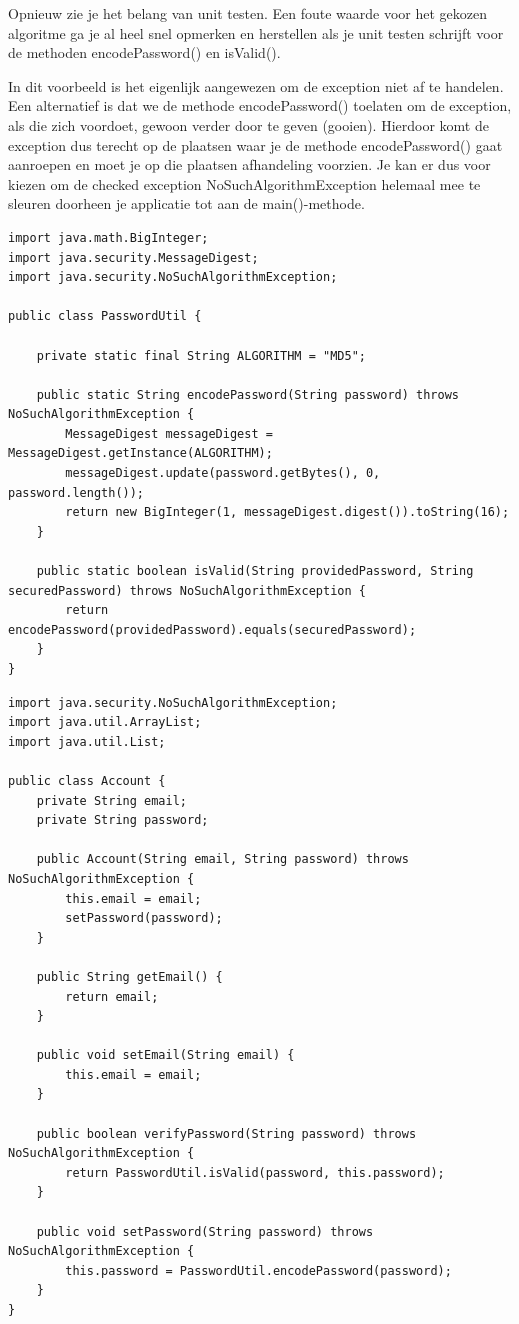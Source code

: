 \documentclass{tstextbook}
\begin{document}
Opnieuw zie je het belang van unit testen. Een foute waarde voor het gekozen algoritme ga je al heel snel opmerken en herstellen als je unit testen schrijft voor de methoden encodePassword() en isValid().

In dit voorbeeld is het eigenlijk aangewezen om de exception niet af te handelen. Een alternatief is dat we de methode encodePassword() toelaten om de exception, als die zich voordoet, gewoon verder door te geven (gooien).
Hierdoor komt de exception dus terecht op de plaatsen waar je de methode encodePassword() gaat aanroepen en moet je op die plaatsen afhandeling voorzien. Je kan er dus voor kiezen om de checked exception NoSuchAlgorithmException helemaal mee te sleuren doorheen je applicatie tot aan de main()-methode.

\begin{lstlisting}
import java.math.BigInteger;
import java.security.MessageDigest;
import java.security.NoSuchAlgorithmException;

public class PasswordUtil {

	private static final String ALGORITHM = "MD5";

	public static String encodePassword(String password) throws NoSuchAlgorithmException {
		MessageDigest messageDigest = MessageDigest.getInstance(ALGORITHM);
		messageDigest.update(password.getBytes(), 0, password.length());
		return new BigInteger(1, messageDigest.digest()).toString(16);
	}

	public static boolean isValid(String providedPassword, String securedPassword) throws NoSuchAlgorithmException {
		return encodePassword(providedPassword).equals(securedPassword);
	}
}
\end{lstlisting}

\begin{lstlisting}
import java.security.NoSuchAlgorithmException;
import java.util.ArrayList;
import java.util.List;

public class Account {
	private String email;
	private String password;

	public Account(String email, String password) throws NoSuchAlgorithmException {
		this.email = email;
		setPassword(password);
	}

	public String getEmail() {
		return email;
	}

	public void setEmail(String email) {
		this.email = email;
	}

	public boolean verifyPassword(String password) throws NoSuchAlgorithmException {
		return PasswordUtil.isValid(password, this.password);
	}

	public void setPassword(String password) throws NoSuchAlgorithmException {
		this.password = PasswordUtil.encodePassword(password);
	}
}
\end{lstlisting}
\end{document}
